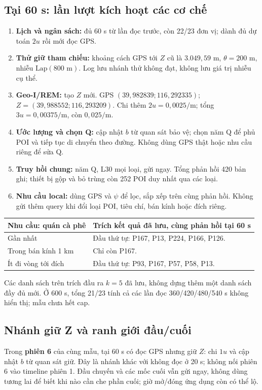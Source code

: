 \documentclass[10pt,a4paper]{article}
\begin{document}
\subsection{Tại 60 s: lần lượt kích hoạt các cơ chế}
\begin{enumerate}
\item \textbf{Lịch và ngân sách:} đủ 60 s từ lần đọc trước, còn 22/23 đơn vị; dành đủ dự toán $2u$ rồi mới đọc GPS.
\item \textbf{Thử giữ tham chiếu:} khoảng cách GPS tới $Z$ cũ là $3.049{,}59$ m,
$\theta=200$ m, nhiễu $\mathrm{Lap}(800\text{ m})$. Log lưu nhánh thử không đạt, không lưu giá trị nhiễu cụ thể.
\item \textbf{Geo-I/REM:} tạo $Z$ mới. GPS $(39{,}982839;116{,}292335)$;
$Z=(39{,}988552;116{,}293209)$. Chi thêm $2u=0{,}0025/\mathrm m$;
tổng $3u=0{,}00375/\mathrm m$, còn $0{,}025/\mathrm m$.
\item \textbf{Ước lượng và chọn Q:} cập nhật $b$ từ quan sát bảo vệ; chọn năm Q để phủ POI và tiếp tục di chuyển theo đường.
Không dùng GPS thật hoặc nhu cầu riêng để sửa Q.
\item \textbf{Truy hồi chung:} năm Q, L30 mọi loại, gửi ngay. Tổng phản hồi 420 bản ghi;
thiết bị gộp và bỏ trùng còn 252 POI duy nhất qua các loại.
\item \textbf{Nhu cầu local:} dùng GPS và $\psi$ để lọc, sắp xếp trên cùng phản hồi.
Không gửi thêm query khi đổi loại POI, tiêu chí, bán kính hoặc đích riêng.
\end{enumerate}

\par\smallskip
\begin{tabularx}{\linewidth}{@{}P{3.8cm}Y@{}}\toprule
\textbf{Nhu cầu: quán cà phê} & \textbf{Trích kết quả đã lưu, cùng phản hồi tại 60 s}\\\midrule
Gần nhất & Đầu thứ tự: P167, P13, P224, P166, P126.\\
Trong bán kính 1 km & Chỉ còn P167.\\
Ít đi vòng tới đích & Đầu thứ tự: P93, P167, P57, P58, P13.\\\bottomrule
\end{tabularx}
Các danh sách trên trích đầu ra $k=5$ đã lưu, không dựng thêm một danh sách đầy đủ mới.
Ở 600 s, tổng 21/23 tính cả các lần đọc 360/420/480/540 s không hiển thị; mẫu chưa hết cap.

\subsection{Nhánh giữ Z và ranh giới đầu/cuối}
Trong \textbf{phiên 6} của cùng mẫu, tại 60 s có đọc GPS nhưng giữ $Z$: chi $1u$ và cập nhật $b$ từ quan sát giữ.
Đây là nhánh khác với không đọc ở 20 s; không nối phiên 6 vào timeline phiên 1.
Đầu chuyến và các mốc cuối vẫn gửi ngay, không dùng tương lai để biết khi nào cần che phần cuối;
giờ mở/đóng ứng dụng còn có thể lộ.
\end{document}
